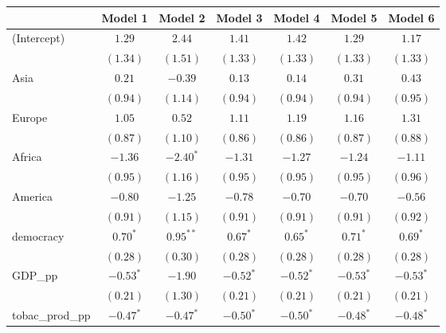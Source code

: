 
\begin{table}[!h]
\begin{center}
\begin{tabular}{l c c c c c c }
\toprule
 & Model 1 & Model 2 & Model 3 & Model 4 & Model 5 & Model 6 \\
\midrule
(Intercept)             & $1.29$       & $2.44$       & $1.41$       & $1.42$       & $1.29$       & $1.17$       \\
                        & $(1.34)$     & $(1.51)$     & $(1.33)$     & $(1.33)$     & $(1.33)$     & $(1.33)$     \\
Asia                    & $0.21$       & $-0.39$      & $0.13$       & $0.14$       & $0.31$       & $0.43$       \\
                        & $(0.94)$     & $(1.14)$     & $(0.94)$     & $(0.94)$     & $(0.94)$     & $(0.95)$     \\
Europe                  & $1.05$       & $0.52$       & $1.11$       & $1.19$       & $1.16$       & $1.31$       \\
                        & $(0.87)$     & $(1.10)$     & $(0.86)$     & $(0.86)$     & $(0.87)$     & $(0.88)$     \\
Africa                  & $-1.36$      & $-2.40^{*}$  & $-1.31$      & $-1.27$      & $-1.24$      & $-1.11$      \\
                        & $(0.95)$     & $(1.16)$     & $(0.95)$     & $(0.95)$     & $(0.95)$     & $(0.96)$     \\
America                 & $-0.80$      & $-1.25$      & $-0.78$      & $-0.70$      & $-0.70$      & $-0.56$      \\
                        & $(0.91)$     & $(1.15)$     & $(0.91)$     & $(0.91)$     & $(0.91)$     & $(0.92)$     \\
democracy               & $0.70^{*}$   & $0.95^{**}$  & $0.67^{*}$   & $0.65^{*}$   & $0.71^{*}$   & $0.69^{*}$   \\
                        & $(0.28)$     & $(0.30)$     & $(0.28)$     & $(0.28)$     & $(0.28)$     & $(0.28)$     \\
GDP\_pp                 & $-0.53^{*}$  & $-1.90$      & $-0.52^{*}$  & $-0.52^{*}$  & $-0.53^{*}$  & $-0.53^{*}$  \\
                        & $(0.21)$     & $(1.30)$     & $(0.21)$     & $(0.21)$     & $(0.21)$     & $(0.21)$     \\
tobac\_prod\_pp         & $-0.47^{*}$  & $-0.47^{*}$  & $-0.50^{*}$  & $-0.50^{*}$  & $-0.48^{*}$  & $-0.48^{*}$  \\

\end{tabular}
\end{center}
\end{table}
